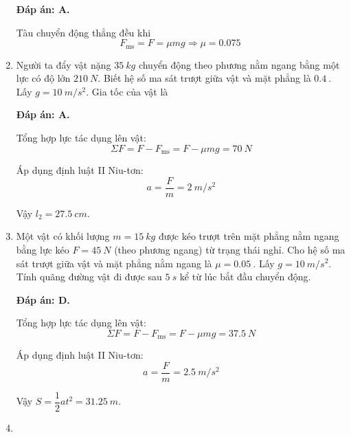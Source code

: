 \begin{enumerate}[label=\bfseries Câu \arabic*:]
	\hideall
	{	\textbf{Đáp án: A.}
		
		Tàu chuyển động thẳng đều khi
		$$F_\text{ms} = F = \mu mg \Rightarrow \mu = \SI{0.075}{}$$
	}
	
	\item {}
	
	
	{Người ta đẩy vật nặng $\SI{35}{kg}$ chuyển động theo phương nằm ngang bằng một lực có độ lớn $\SI{210}{N}$. Biết hệ số ma sát trượt giữa vật và mặt phẳng là $\SI{0.4}{}$. Lấy $g=\SI{10}{m/s^2}$. Gia tốc của vật là
	}
	
	\hideall
	{	\textbf{Đáp án: A.}	
		
		Tổng hợp lực tác dụng lên vật:
		$$\Sigma F= F-F_\text{ms} = F - \mu mg = \SI{70}{N}$$
		
		Áp dụng định luật II Niu-tơn:
		$$a=\dfrac{F}{m} = \SI{2}{m/s^2}$$
		
		Vậy $l_2 = \SI{27.5}{cm}$.
	}
	\item {}
	
	
	{Một vật có khối lượng $m=\SI{15}{kg}$ được kéo trượt trên mặt phẳng nằm ngang bằng lực kéo $F=\SI{45}{N}$ (theo phương ngang) từ trạng thái nghỉ. Cho hệ số ma sát trượt giữa vật và mặt phẳng nằm ngang là $\mu = \SI{0.05}{}$. Lấy $g=\SI{10}{m/s^2}$. Tính quãng đường vật đi được sau $\SI{5}{s}$ kể từ lúc bắt đầu chuyển động.
	}
	
	\hideall
	{	\textbf{Đáp án: D.}	
		
		Tổng hợp lực tác dụng lên vật:
		$$\Sigma F= F-F_\text{ms} = F - \mu mg = \SI{37.5}{N}$$
		
		Áp dụng định luật II Niu-tơn:
		$$a=\dfrac{F}{m} = \SI{2.5}{m/s^2}$$
		
		Vậy $S=\dfrac{1}{2}at^2 = \SI{31.25}{m}$.
	}
	\item {}
	

\end{enumerate}
